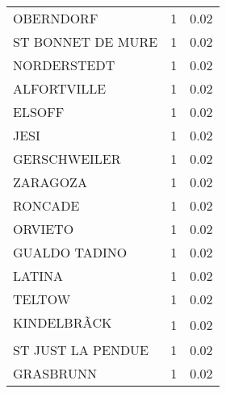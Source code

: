 \begin{table*}[htbp]
\begin{tabular}{lrr}
OBERNDORF & 1 & 0.02 \\
ST BONNET DE MURE & 1 & 0.02 \\
NORDERSTEDT & 1 & 0.02 \\
ALFORTVILLE & 1 & 0.02 \\
ELSOFF & 1 & 0.02 \\
JESI & 1 & 0.02 \\
GERSCHWEILER & 1 & 0.02 \\
ZARAGOZA & 1 & 0.02 \\
RONCADE & 1 & 0.02 \\
ORVIETO & 1 & 0.02 \\
GUALDO TADINO & 1 & 0.02 \\
LATINA & 1 & 0.02 \\
TELTOW & 1 & 0.02 \\
KINDELBRÃCK & 1 & 0.02 \\
ST JUST LA PENDUE & 1 & 0.02 \\
GRASBRUNN & 1 & 0.02 \\
\bottomrule
\end{tabular}
\end{table*}

